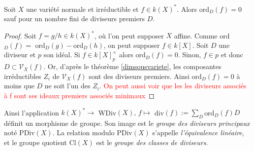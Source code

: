 \begin{prop}
Soit $X$ une variété normale et irréductible et $f\in k(X)^*$. Alors ord$_D(f)=0$ sauf pour un nombre fini de diviseurs premiers $D$.
\end{prop}
\begin{proof}
Soit $f=g/h\in k(X)^*$, où l'on peut supposer $X$ affine. Comme ord$_D(f)=$ ord$_D(g)-$ord$_D(h)$, on peut supposer $f\in k[X]$. Soit $D$ une diviseur et $p$ son idéal. Si $f\in k[X]_p^\times$ alors ord$_D(f)=0$. Sinon, $f\in p$ et donc $D \subset \mathcal{V}_X(f)$. Or, d'après le théorème \ref{dimsousvariete}, les composantes irréductibles $Z_i$ de $\mathcal{V}_X(f)$ sont des diviseurs premiers. Ainsi ord$_D(f)=0$ à moins que $D$ ne soit l'un des $Z_i$.
\textcolor{red}{On peut aussi voir que les les diviseurs associés à f sont ses ideaux premiers associés minimaux}
\end{proof}

Ainsi l'application $k(X)^*\rightarrow $ WDiv$(X),\, f\mapsto $ div$(f):=\sum_D$ord$_D(f)D$ définit un morphisme de groupe. Son image est le \textit{groupe des diviseurs principaux} noté PDiv$(X)$. La relation modulo PDiv$(X)$ s'appelle \textit{l'équivalence linéaire}, et le groupe quotient Cl$(X)$ est le \textit{groupe des classes de diviseurs}.\\


